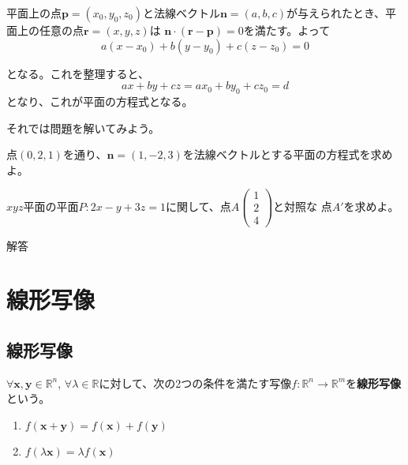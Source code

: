 \documentclass{jlreq}
\begin{document}
\begin{theorembox}[平面の方程式]
  平面上の点$\boldsymbol{p} = (x_0, y_0, z_0)$と法線ベクトル$\boldsymbol{n} = (a, b, c)$が与えられたとき、平面上の任意の点$\boldsymbol{r} = (x, y, z)$は
  $\boldsymbol{n} \cdot (\boldsymbol{r} - \boldsymbol{p}) = 0$を満たす。よって
  \begin{equation*}
    a(x - x_0) + b(y - y_0) + c(z - z_0) = 0
  \end{equation*}

  となる。これを整理すると、
  \begin{equation*}
    ax + by + cz = a x_0 + b y_0 + c z_0 = d
  \end{equation*}
   となり、これが平面の方程式となる。
\end{theorembox}

それでは問題を解いてみよう。

\begin{problem}
  点$(0, 2, 1)$を通り、$\boldsymbol{n} = (1, -2, 3)$を法線ベクトルとする平面の方程式を求めよ。
\end{problem}

\begin{problem}
  $xyz$平面の平面$P: 2x - y + 3z = 1$に関して、点$A \begin{pmatrix} 1 \\ 2 \\ 4 \end{pmatrix}$と対照な
  点$A'$を求めよ。

  \dotfill
  解答 \\
\end{problem}

\section{線形写像}

\subsection{線形写像}
\begin{definitionbox}[線形写像]
  $\forall \boldsymbol{x}, \boldsymbol{y} \in \mathbb{R}^n$, $\forall \lambda \in \mathbb{R}$に対して、次の2つの条件を満たす写像$f: \mathbb{R}^n \to \mathbb{R}^m$を\textbf{線形写像}という。

  \begin{enumerate}
    \item $f(\boldsymbol{x} + \boldsymbol{y}) = f(\boldsymbol{x}) + f(\boldsymbol{y})$
    \item $f(\lambda \boldsymbol{x}) = \lambda f(\boldsymbol{x})$
  \end{enumerate}
\end{definitionbox}
\end{document}
